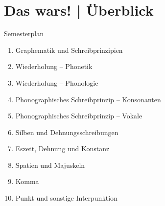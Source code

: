 % 
% 
% 
% 

\ifdefined\TITLE
  \section{Das wars! | Überblick}

  \begin{frame}
    {Semesterplan}
    \begin{enumerate}
      \item Graphematik und Schreibprinzipien
      \item Wiederholung -- Phonetik
      \item Wiederholung -- Phonologie
      \item Phonographisches Schreibprinzip -- Konsonanten
      \item Phonographisches Schreibprinzip -- Vokale
      \item Silben und Dehnungsschreibungen
      \item Eszett, Dehnung und Konstanz
      \item Spatien und Majuskeln
      \item Komma
      \item \alert{Punkt und sonstige Interpunktion}
    \end{enumerate}
  \end{frame}
\fi

